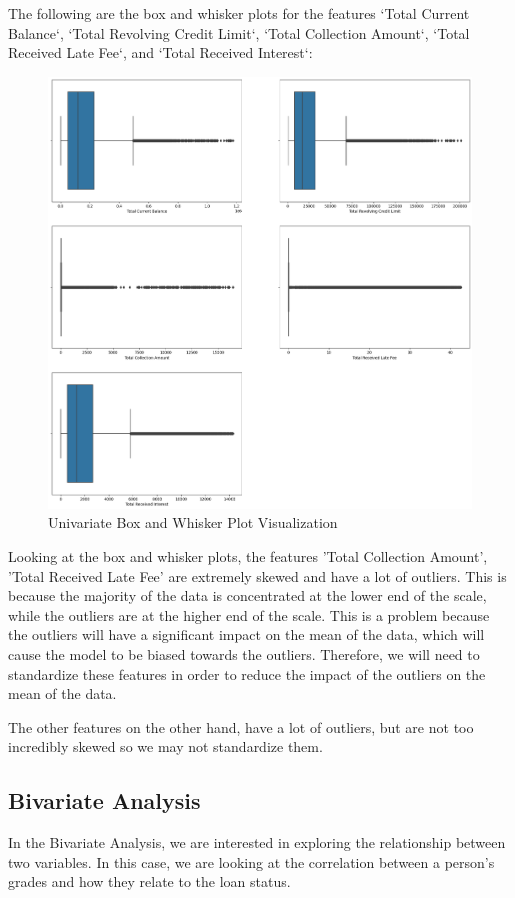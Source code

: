 \documentclass[sigplan]{acmart}
\begin{document}
The following are the box and whisker plots for the features `Total Current Balance`, `Total Revolving Credit Limit`, `Total Collection Amount`, `Total Received Late Fee`, and `Total Received Interest`:
\begin{figure}[h]
    \centering
    \includegraphics[width=\linewidth]{images/boxnwhiskers.png}
    \caption{Univariate Box and Whisker Plot Visualization}
\end{figure}
\newpage
Looking at the box and whisker plots, the features 'Total Collection Amount', 'Total Received Late Fee' are extremely skewed and have a lot of outliers. This is because the majority of the data is concentrated at the lower end of the scale, while the outliers are at the higher end of the scale.
This is a problem because the outliers will have a significant impact on the mean of the data, which will cause the model to be biased towards the outliers. Therefore, we will need to standardize these features in order to reduce the impact of the outliers on the mean of the data.

The other features on the other hand, have a lot of outliers, but are not too incredibly skewed so we may not standardize them.
\newpage
\subsection{Bivariate Analysis}
In the Bivariate Analysis, we are interested in exploring the relationship between two variables. In this case, we are looking at the correlation between a person's grades and how they relate to the loan status.
\end{document}
